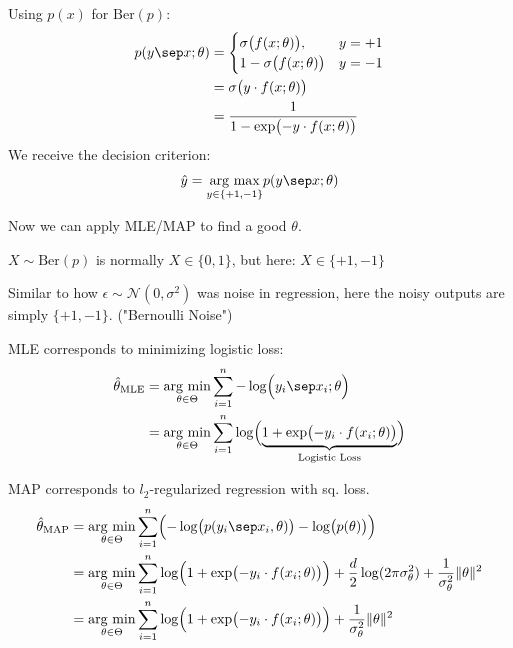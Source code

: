 Using $p(x)$ for $\text{Ber}(p)$:\\
\begin{align*}
    p(y\sep x;\theta)   &= \begin{cases}
                                \sigma\bigl( f(x;\theta) \bigr),        & y = +1 \\
                                1 - \sigma\bigl( f(x;\theta) \bigr)     & y = -1 
                            \end{cases} \\
                        &= \sigma\bigl( y \cdot f(x;\theta) \bigr)  \\
                        &= \frac{1}{1-\exp\bigl(-y \cdot f(x;\theta)\bigr)}
\end{align*}
We receive the decision criterion:
$$
    \hat{y} = \underset{y\in\{ +1,-1 \}}{\text{arg max}} p(y\sep x;\theta)
$$

Now we can apply MLE/MAP to find a good $\theta$.

{\footnotesize
    \remark $X \sim \text{Ber}(p)$ is normally $X \in \{0,1\}$, but here: $X \in \{+1,-1\}$

    \remark Similar to how $\epsilon \sim \mathcal{N}(0,\sigma^2)$ was noise in regression, here the noisy outputs are simply $\{+1,-1\}$. ("Bernoulli Noise")
}

MLE corresponds to minimizing logistic loss:
\begin{align*}
    \hat{\theta}_\text{MLE} &= \underset{\theta\in\Theta}{\text{arg min}} \sum_{i=1}^n -\log\Bigl( y_i \sep x_i;\theta \Bigr) \\
                            &= \underset{\theta\in\Theta}{\text{arg min}} \sum_{i=1}^n  \log\Bigl( \underbrace{1+\exp\bigl( -y_i \cdot f(x_i;\theta) \bigr)}_\text{Logistic Loss} \Bigr)
\end{align*}

\newpage

MAP corresponds to $l_2$-regularized regression with sq. loss.\\
{\footnotesize
    \begin{align*}
        \hat{\theta}_\text{MAP} &= \underset{\theta\in\Theta}{\text{arg min}} \sum_{i=1}^n \Bigl( -\log\bigl( p(y_i\sep x_i, \theta) \bigr) - \log\bigl(p(\theta)\bigr) \Bigr) \\
                                &= \underset{\theta\in\Theta}{\text{arg min}} \sum_{i=1}^n \log \Bigl( 1+\exp\bigl( -y_i \cdot f(x_i;\theta) \bigr) \Bigr) + \frac{d}{2}\log(2\pi\sigma^2_\theta) + \frac{1}{\sigma^2_\theta}\Vert\theta\Vert^2 \\
                                &= \underset{\theta\in\Theta}{\text{arg min}} \sum_{i=1}^n \log \Bigl( 1+\exp\bigl( -y_i \cdot f(x_i;\theta) \bigr) \Bigr) + \frac{1}{\sigma^2_\theta}\Vert\theta\Vert^2
    \end{align*}
}


